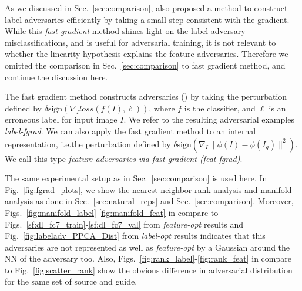 \documentclass{article} %
\begin{document}
As we discussed in Sec.~\ref{sec:comparison}, \cite{GoodfellowEtalICLR2015} 
also proposed a method to construct label adversaries efficiently by taking 
a small step consistent with the gradient.  While this {\em fast gradient} 
method shines light on the label adversary misclassifications, and is useful 
for adversarial training, it is not relevant to whether the linearity 
hypothesis explains the feature adversaries.  Therefore we omitted the 
comparison in Sec.~\ref{sec:comparison} to fast gradient method, and continue 
the discussion here.

The fast gradient method constructs adversaries (\cite{GoodfellowEtalICLR2015}) 
by taking the perturbation defined by $\delta \text{sign}(\nabla_I loss(f(I), 
\ell ))$, where $f$ is the classifier, and $\ell$ is an erroneous label for 
input image $I$.  We refer to the resulting adversarial examples {\em 
label-fgrad}. We can also apply the fast gradient method to an internal 
representation, i.e.\taking the perturbation defined by $\delta 
\text{sign}(\nabla_I \| \phi(I) - \phi(I_g) \|^2)$. We call this
type {\em feature adversaries via fast gradient (feat-fgrad)}.

The same experimental setup as in Sec.~\ref{sec:comparison} is used here.  In 
Fig.~\ref{fig:fgrad_plots}, we show the nearest neighbor rank analysis and 
manifold analysis as done in Sec.~\ref{sec:natural_reps} and 
Sec.~\ref{sec:comparison}.  Moreover, 
Figs.~\ref{fig:manifold_label}-\ref{fig:manifold_feat} in compare to 
Figs.~\ref{sf:dl_fc7_train}-\ref{sf:dl_fc7_val} from {\em feature-opt} results 
and Fig.~\ref{fig:labeladv_PPCA_Dist} from {\em label-opt} results indicates 
that this adversaries are not represented as well as {\em feature-opt} by 
a Gaussian around the NN of the adversary too. Also, 
Figs.~\ref{fig:rank_label}-\ref{fig:rank_feat} in compare to 
Fig.~\ref{fig:scatter_rank} show the obvious difference in adversarial 
distribution for the same set of source and guide.
\end{document}
